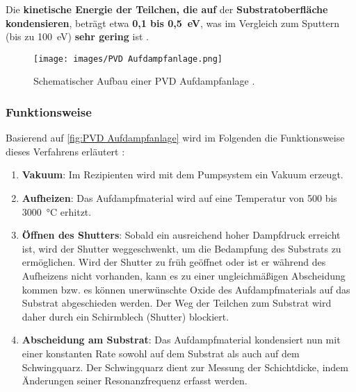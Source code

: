 \documentclass{article} %
\begin{document}
\vspace{1em}

Die \textbf{kinetische Energie der Teilchen, die auf} der \textbf{Substratoberfläche kondensieren}, beträgt etwa \textbf{0,1 bis 0,5~eV}, was im Vergleich zum Sputtern (bis zu 100~eV) \textbf{sehr gering} ist \cite{keplinger2024}.

\begin{figure}[htb!]
    \centering
    \texttt{[image: images/PVD Aufdampfanlage.png]} %
    \captionsetup{labelfont=bf} %
    \caption{Schematischer Aufbau einer PVD Aufdampfanlage \cite{keplinger2024}.}
    \label{fig:PVD Aufdampfanlage}
\end{figure}





\vspace{1em}

\subsubsection{Funktionsweise}

Basierend auf \autoref{fig:PVD Aufdampfanlage} wird im Folgenden die Funktionsweise dieses Verfahrens erläutert \cite{keplinger2024}:

\begin{enumerate}
    \item \textbf{Vakuum}: Im Rezipienten wird mit dem Pumpsystem ein Vakuum erzeugt.
    \item \textbf{Aufheizen}: Das Aufdampfmaterial wird auf eine Temperatur von 500 bis 3000~°C erhitzt.
    \item \textbf{Öffnen des Shutters}: Sobald ein ausreichend hoher Dampfdruck erreicht ist, wird der Shutter weggeschwenkt, um die Bedampfung des Substrats zu ermöglichen. Wird der Shutter zu früh geöffnet oder ist er während des Aufheizens nicht vorhanden, kann es zu einer ungleichmäßigen Abscheidung kommen bzw. es können unerwünschte Oxide des Aufdampfmaterials auf das Substrat abgeschieden werden. Der Weg der Teilchen zum Substrat wird daher durch ein Schirmblech (Shutter) blockiert.
    \item \textbf{Abscheidung am Substrat}: Das Aufdampfmaterial kondensiert nun mit einer konstanten Rate sowohl auf dem Substrat als auch auf dem Schwingquarz. Der Schwingquarz dient zur Messung der Schichtdicke, indem Änderungen seiner Resonanzfrequenz erfasst werden.
\end{enumerate}
\end{document}
